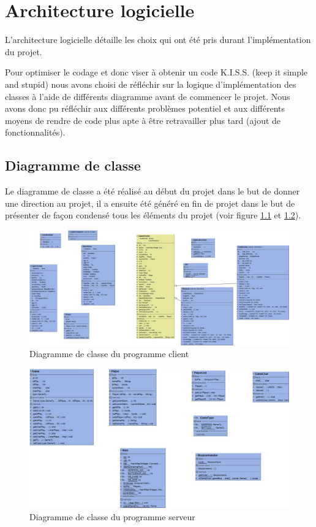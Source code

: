\documentclass{report}
\begin{document}
\chapter{Architecture logicielle}
L'architecture logicielle détaille les choix qui ont été pris durant l'implémentation du projet.

Pour optimiser le codage et donc viser à obtenir un code K.I.S.S. (keep it simple and stupid) nous avons choisi de réfléchir sur la logique d'implémentation
des classes à l'aide de différents diagramme avant de commencer le projet. Nous avons donc pu réfléchir
aux différents problèmes potentiel et aux différents moyens de rendre de code plus apte à être retravailler plus tard (ajout de fonctionnalités).

\section{Diagramme de classe}
Le diagramme de classe a été réalisé au début du projet dans le but de donner une direction au projet, il a ensuite été généré en fin de projet
dans le but de présenter de façon condensé tous les éléments du projet (voir figure \ref{diagramme de classe client figure} et \ref{diagramme de classe serveur figure}).

\begin{figure}[H]
	\centering\includegraphics[width=15cm]{classdiagrammclient}
	\caption{Diagramme de classe du programme client}
  \label{diagramme de classe client figure}
\end{figure}

\begin{figure}[H]
	\centering\includegraphics[width=15cm]{classdiagrammserver}
	\caption{Diagramme de classe du programme serveur}
  \label{diagramme de classe serveur figure}
\end{figure}
\end{document}
